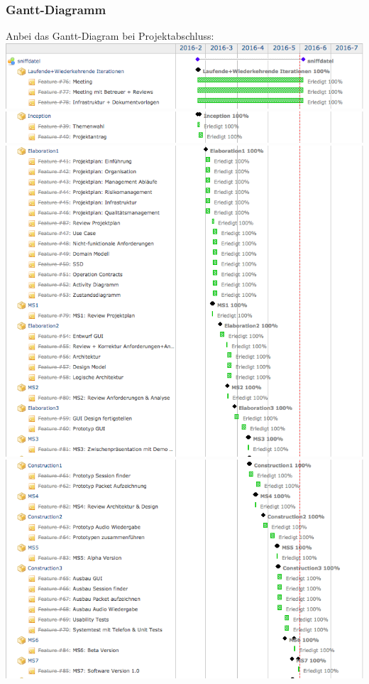 \documentclass[a4,12pt]{scrartcl}
\begin{document}
\subsubsection{Gantt-Diagramm}
 Anbei das Gantt-Diagram bei Projektabschluss: \\
\includegraphics[width=1\textwidth]{./pictures/allgemein.png}\\
\includegraphics[width=1\textwidth]{./pictures/inception.png}\\
\includegraphics[width=1\textwidth]{./pictures/elaboration.png}\\
\includegraphics[width=1\textwidth]{./pictures/construction.png}\\
\end{document}
